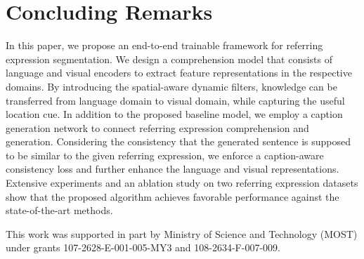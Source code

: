 \documentclass{bmvc2k}
\begin{document}
\section{Concluding Remarks}
In this paper, we propose an end-to-end trainable framework for referring expression segmentation.
We design a comprehension model that consists of language and visual encoders to extract feature representations in the respective domains. By introducing the spatial-aware dynamic filters, knowledge can be transferred from language domain to visual domain, while capturing the useful location cue.
In addition to the proposed baseline model, we employ a caption generation network to connect referring expression comprehension and generation.
Considering the consistency that the generated sentence is supposed to be similar to the given referring expression, we enforce a caption-aware consistency loss and further enhance the language and visual representations.
Extensive experiments and an ablation study on two referring expression datasets show that the proposed algorithm achieves favorable performance against the state-of-the-art methods.

{} This work was supported in part by Ministry of Science and Technology (MOST) under grants 107-2628-E-001-005-MY3 and 108-2634-F-007-009.




\end{document}

